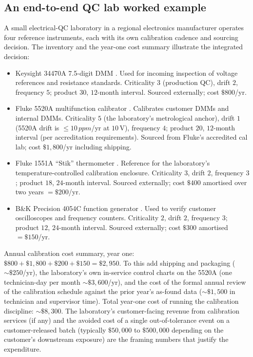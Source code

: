 \subsection{An end-to-end QC lab worked example}

A small electrical-QC laboratory in a regional electronics
manufacturer operates four reference instruments, each with its
own calibration cadence and sourcing decision. The inventory and
the year-one cost summary illustrate the integrated decision:

\begin{itemize}[leftmargin=*]
  \item Keysight 34470A 7.5-digit DMM
    \cite{web:ch03t3-keysight-34470a}. Used for incoming inspection
    of voltage references and resistance standards.
    Criticality $3$ (production QC), drift $2$, frequency $5$;
    product $30$, $12$-month interval. Sourced externally; cost
    $\$800$/yr.
  \item Fluke 5520A multifunction calibrator
    \cite{web:ch03t3-fluke-5520a}. Calibrates customer DMMs and
    internal DMMs. Criticality $5$ (the laboratory's metrological
    anchor), drift $1$ (5520A drift is $\leq 10\,\si{ppm}$/yr at
    $10\,\si{\volt}$), frequency $4$;
    product $20$, $12$-month interval (per accreditation
    requirements). Sourced from Fluke's accredited cal lab; cost
    $\$1{,}800$/yr including shipping.
  \item Fluke 1551A ``Stik'' thermometer
    \cite{web:ch03t3-fluke-1551a-stik}. Reference for the
    laboratory's temperature-controlled calibration enclosure.
    Criticality $3$, drift $2$, frequency $3$; product $18$,
    $24$-month interval. Sourced externally; cost $\$400$ amortised
    over two years $= \$200$/yr.
  \item B\&K Precision 4054C function generator
    \cite{web:ch03t3-bk-4054c}. Used to verify customer
    oscilloscopes and frequency counters. Criticality $2$,
    drift $2$, frequency $3$; product $12$, $24$-month interval.
    Sourced externally; cost $\$300$ amortised $= \$150$/yr.
\end{itemize}

Annual calibration cost summary, year one: $\$800 + \$1{,}800 +
\$200 + \$150 = \$2{,}950$. To this add shipping and packaging
($\sim \$250$/yr), the laboratory's own in-service control charts
on the 5520A (one technician-day per month $\sim \$3{,}600$/yr),
and the cost of the formal annual review of the calibration
schedule against the prior year's as-found data ($\sim \$1{,}500$
in technician and supervisor time). Total year-one cost of
running the calibration discipline: $\sim \$8{,}300$. The
laboratory's customer-facing revenue from calibration services
(if any) and the avoided cost of a single out-of-tolerance event
on a customer-released batch (typically $\$50{,}000$ to
$\$500{,}000$ depending on the customer's downstream exposure)
are the framing numbers that justify the expenditure.


